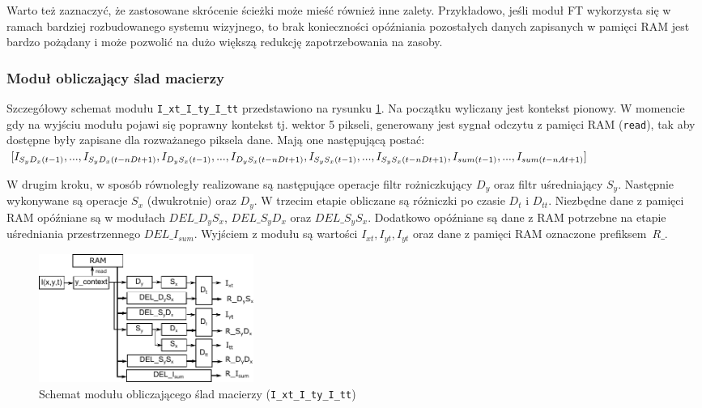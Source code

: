 \documentclass[10pt,a4paper]{article}
\begin{document}
Warto też zaznaczyć, że zastosowane skrócenie ścieżki może mieść również inne zalety.
Przykładowo, jeśli moduł FT wykorzysta się w ramach bardziej rozbudowanego systemu wizyjnego, to brak konieczności opóźniania pozostałych danych zapisanych w pamięci RAM jest bardzo pożądany i może pozwolić na dużo większą redukcję zapotrzebowania na zasoby.

\subsubsection{Moduł obliczający ślad macierzy}
\label{ssec:trace_computation}
Szczegółowy schemat modułu \texttt{I\_xt\_I\_ty\_I\_tt} przedstawiono na rysunku \ref{fig:FluxTraceFinal}.
Na początku wyliczany jest kontekst pionowy. W momencie gdy na wyjściu modułu pojawi się poprawny kontekst tj. wektor 5 pikseli,  generowany jest sygnał odczytu z pamięci RAM (\texttt{read}), tak aby dostępne były zapisane dla rozważanego piksela dane.
Mają one następującą postać: \\
$[I_{S_yD_x(t-1)}, ... ,I_{S_yD_x(t-nDt+1)},
I_{D_yS_x(t-1)}, ... ,I_{D_yS_x(t-nDt+1)}, \\
I_{S_yS_x(t-1)}, ... ,I_{S_yS_x(t-nDt+1)},
I_{sum(t-1)}, ... ,I_{sum(t-nAt+1)}]$

W drugim kroku, w sposób równoległy realizowane są następujące operacje filtr rożniczkujący $D_y$ oraz filtr uśredniający $S_y$. 
Następnie wykonywane są operacje $S_x$ (dwukrotnie) oraz  $D_y$.
W trzecim etapie obliczane są różniczki po czasie $D_{t}$ i $D_{tt}$.
Niezbędne dane z pamięci RAM opóźniane są w modułach $DEL\_D_yS_x$, $DEL\_S_yD_x$ oraz $DEL\_S_yS_x$.
Dodatkowo opóźniane są dane z RAM potrzebne na etapie uśredniania przestrzennego $DEL\_I_{sum}$.
Wyjściem z modułu są wartości $I_{xt}, I_{yt}, I_{yt}$ oraz dane z pamięci RAM oznaczone prefiksem~$R\_$.

\begin{figure}[h]
	\centering
	\includegraphics[width=7cm]{img/Ixt_Iyt_Itt.pdf}
	\caption{Schemat modułu obliczającego ślad macierzy (\texttt{I\_xt\_I\_ty\_I\_tt})}
	\label{fig:FluxTraceFinal}
\end{figure}
\end{document}
